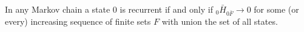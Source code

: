 In any Markov chain a state $0$ is recurrent if and only if ${}_0 \bar{H}_{0\bar{F}} \to 0$ for some (or every) increasing sequence of finite sets $F$ with union the set of all states.
